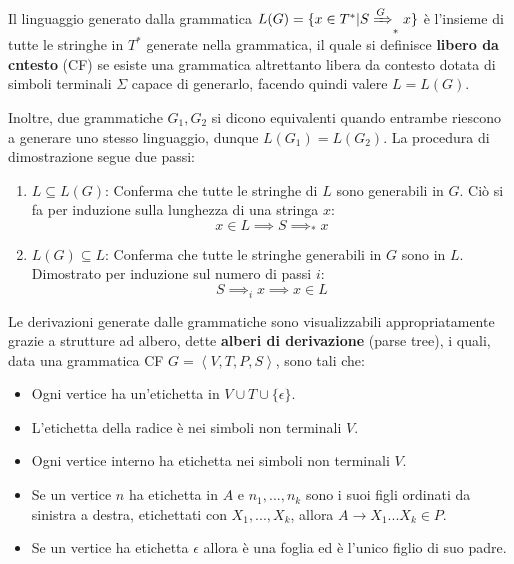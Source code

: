 \noindent Il linguaggio generato dalla grammatica $L(G) = \{x\in T^* | S\xRightarrow{G}_* x\}$ è l'insieme di tutte le stringhe in $T^*$ generate nella
grammatica, il quale si definisce \textbf{libero da cntesto} (CF) se esiste una grammatica altrettanto libera da contesto dotata di simboli terminali
$\Sigma$ capace di generarlo, facendo quindi valere $L = L(G)$.\par
Inoltre, due grammatiche $G_1, G_2$ si dicono equivalenti quando entrambe riescono a generare uno stesso linguaggio, dunque $L(G_1) = L(G_2)$. La
procedura di dimostrazione segue due passi: \begin{enumerate}
    \item $L\subseteq L(G)$: Conferma che tutte le stringhe di $L$ sono generabili in $G$. Ciò si fa per induzione sulla lunghezza di una stringa $x$:
    \[
        x\in L \implies S\implies_* x
    \]
    \item $L(G)\subseteq L$: Conferma che tutte le stringhe generabili in $G$ sono in $L$. Dimostrato per induzione sul numero di passi $i$: \[
        S\implies_i x \implies x\in L
    \]
\end{enumerate}

\noindent Le derivazioni generate dalle grammatiche sono visualizzabili appropriatamente grazie a strutture ad albero, dette \textbf{alberi di
derivazione} (parse tree), i quali, data una grammatica CF $G = \left<V, T, P, S\right>$, sono tali che: \begin{itemize}
    \item Ogni vertice ha un'etichetta in $V\cup T\cup \{\epsilon\}$.
    \item L'etichetta della radice è nei simboli non terminali $V$.
    \item Ogni vertice interno ha etichetta nei simboli non terminali $V$.
    \item Se un vertice $n$ ha etichetta in $A$ e $n_1, ..., n_k$ sono i suoi figli ordinati da sinistra a destra, etichettati con $X_1, ..., X_k$, allora $A\to X_1...X_k\in P$.
    \item Se un vertice ha etichetta $\epsilon$ allora è una foglia ed è l'unico figlio di suo padre.
\end{itemize}

